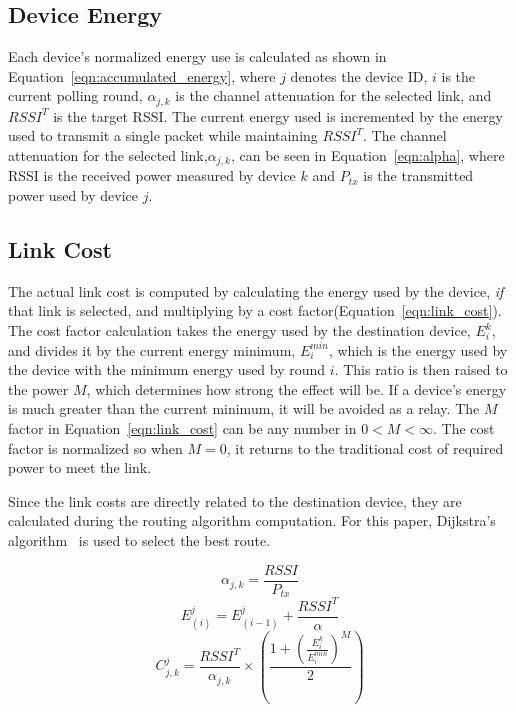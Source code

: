 \documentclass{article}
\begin{document}
\subsection{Device Energy}
Each device's normalized energy use is calculated as shown in Equation~\ref{eqn:accumulated_energy}, where $j$ denotes the device ID, $i$ is the current polling round, $\alpha_{j,k}$ is the channel attenuation for the selected link, and $RSSI^T$ is the target RSSI. The current energy used is incremented by the energy used to transmit a single packet while maintaining $RSSI^T$. The channel attenuation for the selected link,$\alpha_{j,k}$, can be seen in Equation~\ref{eqn:alpha}, where RSSI is the received power measured by device $k$ and $P_{tx}$ is the transmitted power used by device $j$. 

\subsection{Link Cost}
The actual link cost is computed by calculating the energy used by the device, \emph{if} that link is selected, and multiplying by a cost factor(Equation~\ref{eqn:link_cost}). The cost factor calculation takes the energy used by the destination device, $E^k_i$, and divides it by the current energy minimum, $E^{min}_{i}$, which is the energy used by the device with the minimum energy used by round $i$. This ratio is then raised to the power $M$, which determines how strong the effect will be. If a device's energy is much greater than the current minimum, it will be avoided as a relay.
The $M$ factor in Equation~\ref{eqn:link_cost} can be any number in $0 < M < \infty$. The cost factor is normalized so when $M=0$, it returns to the traditional cost of required power to meet the link.

Since the link costs are directly related to the destination device, they are calculated during the routing algorithm computation. For this paper, Dijkstra's algorithm~\cite{dijkstra:algorithm} is used to select the best route.

\begin{equation}
\label{eqn:alpha}
\alpha_{j,k} = \frac{RSSI}{P_{tx}}
\end{equation}
\begin{equation}
\label{eqn:accumulated_energy}
E^j_{(i)} = E^j_{(i-1)} + \frac{RSSI^T}{\alpha}
\end{equation}
\begin{equation}
\label{eqn:link_cost}
C^j_{j,k} = \frac{RSSI^T}{\alpha_{j,k}} \times \left( \frac{1+\left(\frac{E^k_i}{E^{min}_{i}} \right)^M}{2} \right)
\end{equation}
\end{document}
